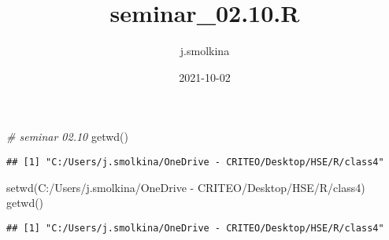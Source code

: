 \documentclass[]{article}
\title{seminar\_02.10.R}
\author{j.smolkina}
\date{2021-10-02}
\newenvironment{Shaded}{\begin{snugshade}}{\end{snugshade}}
\newcommand{\AttributeTok}[1]{\textcolor[rgb]{0.77,0.63,0.00}{#1}}
\newcommand{\CommentTok}[1]{\textcolor[rgb]{0.56,0.35,0.01}{\textit{#1}}}
\newcommand{\ConstantTok}[1]{\textcolor[rgb]{0.00,0.00,0.00}{#1}}
\newcommand{\DecValTok}[1]{\textcolor[rgb]{0.00,0.00,0.81}{#1}}
\newcommand{\FunctionTok}[1]{\textcolor[rgb]{0.00,0.00,0.00}{#1}}
\newcommand{\NormalTok}[1]{#1}
\newcommand{\OtherTok}[1]{\textcolor[rgb]{0.56,0.35,0.01}{#1}}
\newcommand{\SpecialCharTok}[1]{\textcolor[rgb]{0.00,0.00,0.00}{#1}}
\newcommand{\StringTok}[1]{\textcolor[rgb]{0.31,0.60,0.02}{#1}}
\begin{document}
\maketitle

\begin{Shaded}
\begin{Highlighting}[]
\CommentTok{\# seminar 02.10}
\FunctionTok{getwd}\NormalTok{()}
\end{Highlighting}
\end{Shaded}

\begin{verbatim}
## [1] "C:/Users/j.smolkina/OneDrive - CRITEO/Desktop/HSE/R/class4"
\end{verbatim}

\begin{Shaded}
\begin{Highlighting}[]
\FunctionTok{setwd}\NormalTok{(}\StringTok{\textquotesingle{}C:/Users/j.smolkina/OneDrive {-} CRITEO/Desktop/HSE/R/class4\textquotesingle{}}\NormalTok{)}
\FunctionTok{getwd}\NormalTok{()}
\end{Highlighting}
\end{Shaded}

\begin{verbatim}
## [1] "C:/Users/j.smolkina/OneDrive - CRITEO/Desktop/HSE/R/class4"
\end{verbatim}

\begin{Shaded}
\end{Shaded}
\end{document}
